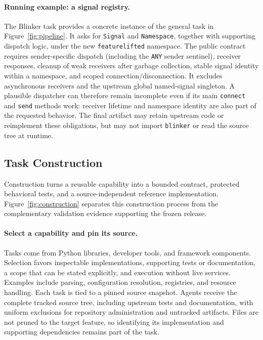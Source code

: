 \documentclass[acmsmall,screen,review,anonymous,nonacm]{acmart}
\begin{document}
\paragraph{Running example: a signal registry.}
The Blinker task provides a concrete instance of the general task in
Figure~\ref{fig:pipeline}. It asks for \texttt{Signal} and \texttt{Namespace}, together
with supporting dispatch logic, under the new \texttt{featurelifted} namespace. The public contract requires
sender-specific dispatch (including the \texttt{ANY} sender sentinel), receiver
responses, cleanup of weak receivers after
garbage collection, stable signal identity within a namespace, and scoped
connection/disconnection. It excludes asynchronous receivers and the upstream
global named-signal singleton. A plausible dispatcher can therefore remain
incomplete even if its main \texttt{connect} and \texttt{send} methods work:
receiver lifetime and namespace identity are also part of the requested behavior.
The final artifact may retain upstream code or reimplement these obligations,
but may not import \texttt{blinker} or read the source tree at runtime.


\subsection{Task Construction}
\label{sec:construction}

Construction turns a reusable capability into a bounded contract, protected
behavioral tests, and a source-independent reference implementation.
Figure~\ref{fig:construction} separates this construction process from the
complementary validation evidence supporting the frozen release.

\paragraph{Select a capability and pin its source.}
Tasks come from Python libraries, developer tools, and framework components.
Selection favors inspectable implementations, supporting tests or documentation,
a scope that can be stated explicitly, and execution without live services.
Examples include parsing, configuration resolution, registries, and resource
handling. Each task is tied to a pinned source snapshot. Agents receive the
complete tracked source tree, including upstream tests and documentation, with
uniform exclusions for repository administration and untracked artifacts.
Files are not pruned to the target feature, so identifying its implementation
and supporting dependencies remains part of the task.
\end{document}
